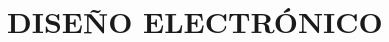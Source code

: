 \documentclass[../General.tex]{subfiles}
\begin{document}
\onehalfspacing
{}


\chapter{DISEÑO ELECTRÓNICO}

%
%
%
%
%
%
%
%
%
%
%
%
\end{document}
